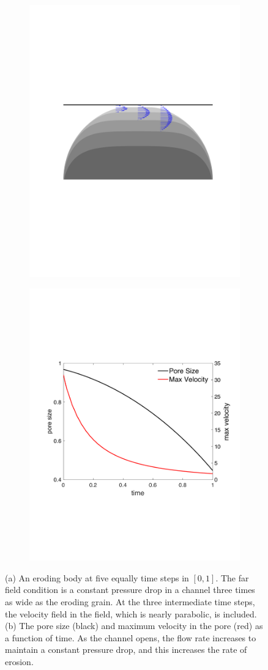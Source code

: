 \documentclass[11pt]{article}
\begin{document}
\begin{figure}[htp]
  \centering
  \begin{subfigure}[b]{0.47\textwidth}
  \begin{center}
  \includegraphics[height=0.55\textwidth]{figs/porelets_geom}
  \end{center}
  \caption{}
  \end{subfigure}
  \begin{subfigure}[b]{0.47\textwidth}
  \begin{center}
  \includegraphics[height=0.55\textwidth]{figs/porelets_size}
  \end{center}
  \caption{}
  \end{subfigure}
  \caption{\label{fig:porelets} (a) An eroding body at five equally time steps in $[0,1]$. The far field condition is a constant pressure drop in a channel three times as wide as the eroding grain.  At the three intermediate time steps, the velocity field in the field, which is nearly parabolic, is included. (b) The pore size (black) and maximum velocity in the pore (red) as a function of time.  As the channel opens, the flow rate increases to maintain a constant pressure drop, and this increases the rate of erosion.} 
\end{figure}
\end{document}
